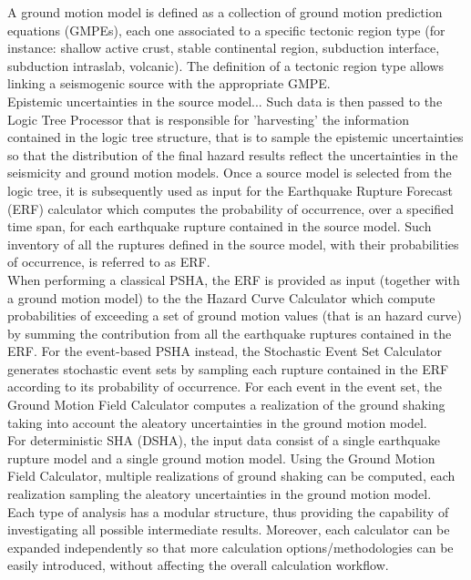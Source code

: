 A ground motion model is defined as a collection of ground motion prediction equations (GMPEs), each one associated to a specific tectonic region type (for instance: shallow active crust, stable continental region, subduction interface, subduction intraslab, volcanic). The definition of a tectonic region type allows linking a seismogenic source with the appropriate GMPE.\\
Epistemic uncertainties in the source model...
Such data is then passed to the Logic Tree Processor that is responsible for 'harvesting' the information contained in the logic tree structure, that is to sample the epistemic uncertainties so that the distribution of the final hazard results reflect the uncertainties in the seismicity and ground motion models. Once a source model is selected from the logic tree, it is subsequently used as input for the Earthquake Rupture Forecast (ERF) calculator which computes the probability of occurrence, over a specified time span, for each earthquake rupture contained in the source model. Such inventory of all the ruptures defined in the source model, with their probabilities of occurrence, is referred to as ERF.\\
When performing a classical PSHA, the ERF is provided as input (together with a ground motion model) to the the Hazard Curve Calculator which compute probabilities of exceeding a set of ground motion values (that is an hazard curve) by summing the contribution from all the earthquake ruptures contained in the ERF. For the event-based PSHA instead, the Stochastic Event Set Calculator generates stochastic event sets by sampling each rupture contained in the ERF according to its probability of occurrence. For each event in the event set, the Ground Motion Field Calculator computes a realization of the ground shaking taking into account the aleatory uncertainties in the ground motion model.\\ 
For deterministic SHA (DSHA), the input data consist of a single earthquake rupture model and a single ground motion model. Using the Ground Motion Field Calculator, multiple realizations of ground shaking can be computed, each realization sampling the aleatory uncertainties in the ground motion model.\\
Each type of analysis has a modular structure, thus providing the capability of investigating all possible intermediate results. Moreover, each calculator can be expanded independently so that more calculation options/methodologies can be easily introduced, without affecting the overall calculation workflow.\\
